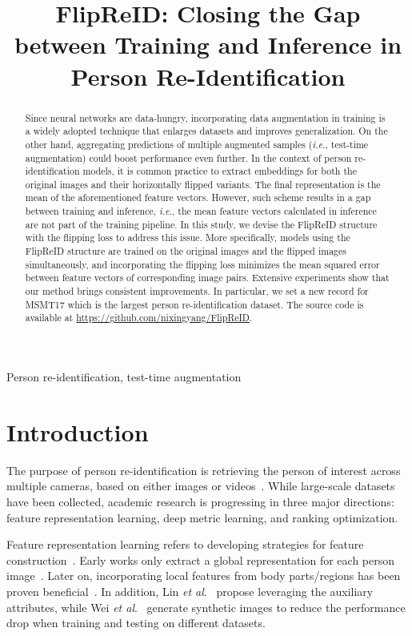 \documentclass{article}
\title{FlipReID: Closing the Gap between Training and Inference in \\Person Re-Identification}
\def\onedot{.}
\def\ie{\emph{i.e}\onedot} \def\Ie{\emph{I.e}\onedot}
\def\etal{\emph{et al}\onedot}
\begin{document}
\maketitle

\begin{abstract}
Since neural networks are data-hungry, incorporating data augmentation in training is a widely adopted technique that enlarges datasets and improves generalization.
On the other hand, aggregating predictions of multiple augmented samples (\ie, test-time augmentation) could boost performance even further.
In the context of person re-identification models, it is common practice to extract embeddings for both the original images and their horizontally flipped variants.
The final representation is the mean of the aforementioned feature vectors.
However, such scheme results in a gap between training and inference, \ie, the mean feature vectors calculated in inference are not part of the training pipeline.
In this study, we devise the FlipReID structure with the flipping loss to address this issue.
More specifically, models using the FlipReID structure are trained on the original images and the flipped images simultaneously, and incorporating the flipping loss minimizes the mean squared error between feature vectors of corresponding image pairs.
Extensive experiments show that our method brings consistent improvements.
In particular, we set a new record for MSMT17 which is the largest person re-identification dataset.
The source code is available at \url{https://github.com/nixingyang/FlipReID}.
\end{abstract}

\begin{keywords}
Person re-identification, test-time augmentation
\end{keywords}

\section{Introduction}

The purpose of person re-identification is retrieving the person of interest across multiple cameras, based on either images or videos~\cite{ye2020deep}.
While large-scale datasets~\cite{zheng2015scalable,ristani2016performance,wei2018person} have been collected, academic research is progressing in three major directions: feature representation learning, deep metric learning, and ranking optimization.

Feature representation learning refers to developing strategies for feature construction~\cite{ye2020deep}.
Early works only extract a global representation for each person image~\cite{zheng2017person,luo2019bag}.
Later on, incorporating local features from body parts/regions has been proven beneficial~\cite{varior2016siamese,sun2018beyond}.
In addition, Lin \etal~\cite{lin2019improving} propose leveraging the auxiliary attributes, while Wei \etal~\cite{wei2018person} generate synthetic images to reduce the performance drop when training and testing on different datasets.
\end{document}
